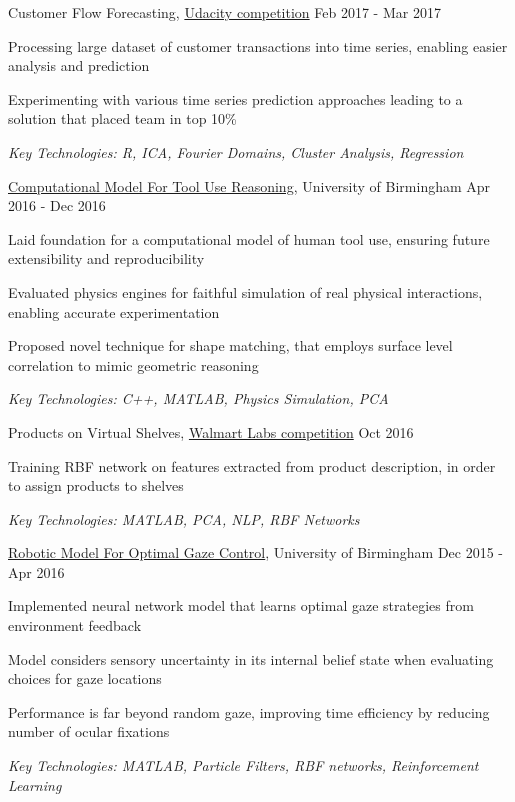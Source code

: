 \documentclass[11pt,article,oneside]{memoir}
\newenvironment{itemize*}{%
  \renewcommand\labelitemi{\textbullet}
  \footnotesize
  \begin{itemize}%
    \setlength{\itemsep}{0pt}}%
  {\end{itemize}
}
\begin{document}
\normalsize
\medskip
\ind Customer Flow Forecasting, \href{https://blog.udacity.com/2017/01/data-science-enthusiasts-win-10000.html}{Udacity competition} \hfill Feb 2017 - Mar 2017
\begin{itemize*}
  \item Processing large dataset of customer transactions into time series, enabling easier analysis and prediction  
  \item Experimenting with various time series prediction approaches leading to a solution that placed team in top 10\%
\end{itemize*}
\ind \hspace{0.35in} \footnotesize \emph{Key Technologies: R, ICA, Fourier Domains, Cluster Analysis, Regression}

\normalsize
\medskip
\ind \href{https://github.com/iceiony/4ConstraintsTheory/}{Computational Model For Tool Use Reasoning}, University of Birmingham \hfill Apr 2016 - Dec 2016
\begin{itemize*}
  \item Laid foundation for a computational model of human tool use, ensuring future extensibility and reproducibility 
  \item Evaluated physics engines for faithful simulation of real physical interactions, enabling accurate experimentation 
  \item Proposed novel technique for shape matching, that employs surface level correlation to mimic geometric reasoning
\end{itemize*}
\ind \hspace{0.35in} \footnotesize \emph{Key Technologies: C++, MATLAB, Physics Simulation, PCA}

\normalsize
\medskip
\ind Products on Virtual Shelves, \href{https://www.hackerrank.com/walmart-codesprint-ml}{Walmart Labs competition} \hfill Oct 2016
\begin{itemize*}
  \item Training RBF network on features extracted from product description, in order to assign products to shelves
\end{itemize*}
\ind \hspace{0.35in} \footnotesize \emph{Key Technologies: MATLAB, PCA, NLP, RBF Networks}

\newpage 

\normalsize
\medskip
\ind \href{https://github.com/iceiony/gaze-control/}{Robotic Model For Optimal Gaze Control}, University of Birmingham \hfill Dec 2015 - Apr 2016
\begin{itemize*}
  \item Implemented neural network model that learns optimal gaze strategies from environment feedback
  \item Model considers sensory uncertainty in its internal belief state when evaluating choices for gaze locations
  \item Performance is far beyond random gaze, improving time efficiency by reducing number of ocular fixations 
\end{itemize*}
\ind \hspace{0.35in} \footnotesize \emph{Key Technologies: MATLAB, Particle Filters, RBF networks, Reinforcement Learning}
\end{document}
